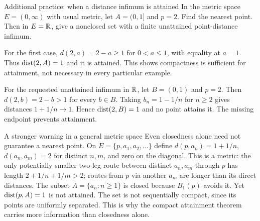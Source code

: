 \begin{exam}{Additional practice: when a distance infimum is attained}
In the metric space $E=(0,\infty)$ with usual metric, let $A=(0,1]$ and $p=2$. Find the nearest point. Then in $E=\mathbb R$, give a nonclosed set with a finite unattained point-distance infimum.
\end{exam}
\begin{answer}
For the first case, $d(2,a)=2-a\ge1$ for $0<a\le1$, with equality at $a=1$. Thus $\operatorname{dist}(2,A)=1$ and it is attained. This shows compactness is sufficient for attainment, not necessary in every particular example.

For the requested unattained infimum in $\mathbb R$, let $B=(0,1)$ and $p=2$. Then $d(2,b)=2-b>1$ for every $b\in B$. Taking $b_n=1-1/n$ for $n\ge2$ gives distances $1+1/n\to1$. Hence $\operatorname{dist}(2,B)=1$ and no point attains it. The missing endpoint prevents attainment.
\end{answer}
\begin{note}{A stronger warning in a general metric space}
Even closedness alone need not guarantee a nearest point. On $E=\{p,a_1,a_2,\ldots\}$ define $d(p,a_n)=1+1/n$, $d(a_n,a_m)=2$ for distinct $n,m$, and zero on the diagonal. This is a metric: the only potentially smaller two-leg route between distinct $a_n,a_m$ through $p$ has length $2+1/n+1/m>2$; routes from $p$ via another $a_m$ are longer than its direct distances. The subset $A=\{a_n:n\ge1\}$ is closed because $B_1(p)$ avoids it. Yet $\operatorname{dist}(p,A)=1$ is not attained. The set is not sequentially compact, since its points are uniformly separated. This is why the compact attainment theorem carries more information than closedness alone.
\end{note}


